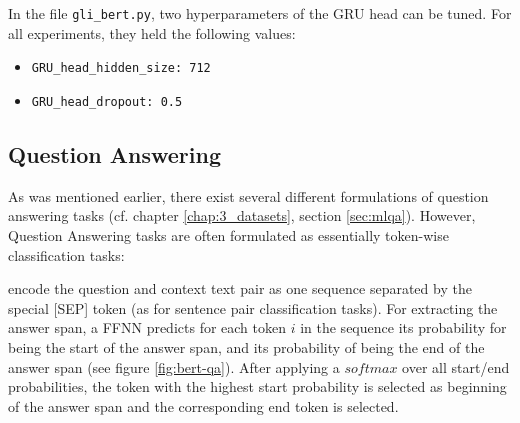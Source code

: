 \begin{tcolorbox}[
  colback=blue!5!white,
  colframe=blue!75!black,
  title={\centering Code}]

  In the file \texttt{gli\_bert.py}, two hyperparameters of the GRU head can be tuned. For all
  experiments, they held the following values:

  \begin{itemize}
    \itemsep0em
    \item[] \texttt{GRU\_head\_hidden\_size: 712}
    \item[] \texttt{GRU\_head\_dropout: 0.5}
  \end{itemize}

\end{tcolorbox}


\subsection{Question Answering}
\label{sec:question-answering}

As was mentioned earlier, there exist several different formulations of question answering tasks
(cf. chapter \ref{chap:3_datasets}, section \ref{sec:mlqa}). However, Question Answering tasks are
often formulated as essentially token-wise classification tasks:

\citeauthor{devlin2018bert} encode the question and context text pair as one sequence
separated by the special [SEP] token (as for sentence pair classification tasks). For
extracting the answer span, a FFNN predicts for each token $i$ in the sequence its
probability for being the start of the answer span, and its probability of being the
end of the answer span (see figure \ref{fig:bert-qa}). After applying a $softmax$ over
all start/end probabilities, the token with the highest start probability is selected
as beginning of the answer span and the corresponding end token is selected.


